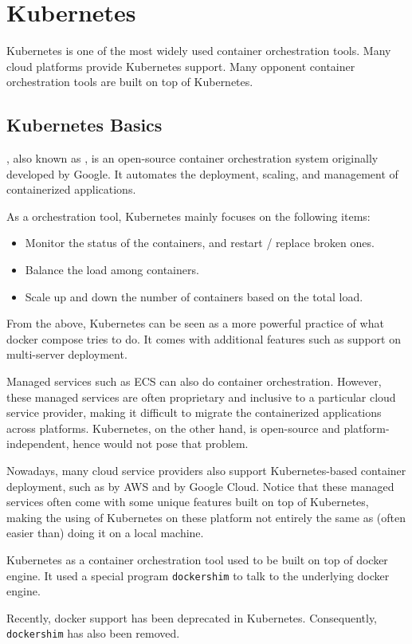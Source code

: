 \chapter{Kubernetes}

Kubernetes is one of the most widely used container orchestration tools. Many cloud platforms provide Kubernetes support. Many opponent container orchestration tools are built on top of Kubernetes.

\section{Kubernetes Basics}

, also known as , is an open-source container orchestration system originally developed by Google. It automates the deployment, scaling, and management of containerized applications.

As a orchestration tool, Kubernetes mainly focuses on the following items:
\begin{itemize}
	\item Monitor the status of the containers, and restart / replace broken ones.
	\item Balance the load among containers.
	\item Scale up and down the number of containers based on the total load.
\end{itemize}
From the above, Kubernetes can be seen as a more powerful practice of what docker compose tries to do. It comes with additional features such as support on multi-server deployment.

Managed services such as ECS can also do container orchestration. However, these managed services are often proprietary and inclusive to a particular cloud service provider, making it difficult to migrate the containerized applications across platforms. Kubernetes, on the other hand, is open-source and platform-independent, hence would not pose that problem.

Nowadays, many cloud service providers also support Kubernetes-based container deployment, such as  by AWS and  by Google Cloud. Notice that these managed services often come with some unique features built on top of Kubernetes, making the using of Kubernetes on these platform not entirely the same as (often easier than) doing it on a local machine.

\begin{shortbox}
	
	Kubernetes as a container orchestration tool used to be built on top of docker engine. It used a special program \verb|dockershim| to talk to the underlying docker engine.
	
	Recently, docker support has been deprecated in Kubernetes. Consequently, \verb|dockershim| has also been removed.
\end{shortbox}


